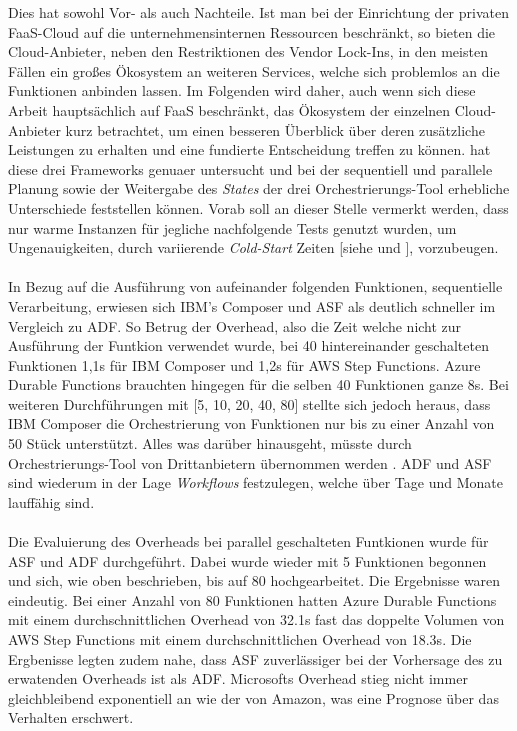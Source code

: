 Dies hat sowohl Vor- als auch Nachteile. Ist man bei der Einrichtung der privaten FaaS-Cloud auf die unternehmensinternen Ressourcen beschränkt, so bieten die Cloud-Anbieter, neben den Restriktionen des Vendor Lock-Ins, in den meisten Fällen ein großes Ökosystem an weiteren Services, welche sich problemlos an die Funktionen anbinden lassen. Im Folgenden wird daher, auch wenn sich diese Arbeit hauptsächlich auf FaaS beschränkt, das Ökosystem der einzelnen Cloud-Anbieter kurz betrachtet, um einen besseren Überblick über deren zusätzliche Leistungen zu erhalten und eine fundierte Entscheidung treffen zu können.
\cite{lopez2018comparison} hat diese drei Frameworks genuaer untersucht und bei der sequentiell und parallele Planung sowie der Weitergabe des \textit{States} der drei Orchestrierungs-Tool erhebliche Unterschiede feststellen können. Vorab soll an dieser Stelle vermerkt werden, dass nur \glqq warme\grqq{} Instanzen für jegliche nachfolgende Tests genutzt wurden, um Ungenauigkeiten, durch variierende \textit{Cold-Start} Zeiten [siehe \cite{manner2018cold} und \cite{jackson2018investigation}], vorzubeugen.\\\\
In Bezug auf die Ausführung von aufeinander folgenden Funktionen, sequentielle Verarbeitung, erwiesen sich IBM's Composer und ASF als deutlich schneller im Vergleich zu ADF. So Betrug der Overhead, also die Zeit welche nicht zur Ausführung der Funtkion verwendet wurde, bei 40 hintereinander geschalteten Funktionen 1,1s für IBM Composer und 1,2s für AWS Step Functions. Azure Durable Functions brauchten hingegen für die selben 40 Funktionen ganze 8s. Bei weiteren Durchführungen mit [5, 10, 20, 40, 80] stellte sich jedoch heraus, dass IBM Composer die Orchestrierung von Funktionen nur bis zu einer Anzahl von 50 Stück unterstützt. Alles was darüber hinausgeht, müsste durch Orchestrierungs-Tool von Drittanbietern übernommen werden \cite{lopez2018comparison}. ADF und ASF sind wiederum in der Lage \textit{Workflows} festzulegen, welche über Tage und Monate lauffähig sind.\\\\
Die Evaluierung des Overheads bei parallel geschalteten Funtkionen wurde für ASF und ADF durchgeführt. Dabei wurde wieder mit 5 Funktionen begonnen und sich, wie oben beschrieben, bis auf 80 hochgearbeitet. Die Ergebnisse waren eindeutig. Bei einer Anzahl von 80 Funktionen hatten Azure Durable Functions mit einem durchschnittlichen Overhead von 32.1s fast das doppelte Volumen von AWS Step Functions mit einem durchschnittlichen Overhead von 18.3s. Die Ergbenisse legten zudem nahe, dass ASF zuverlässiger bei der Vorhersage des zu erwatenden Overheads ist als ADF. Microsofts Overhead stieg nicht immer gleichbleibend exponentiell an wie der von Amazon, was eine Prognose über das Verhalten erschwert.\\\\
